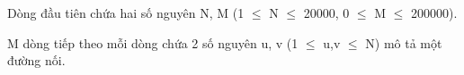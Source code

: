 Dòng đầu tiên chứa hai số nguyên N, M (1  $\le$  N  $\le$  20000, 0  $\le$  M  $\le$  200000).

M dòng tiếp theo mỗi dòng chứa 2 số nguyên u, v (1 $\le$ u,v  $\le$ N) mô tả một đường nối.